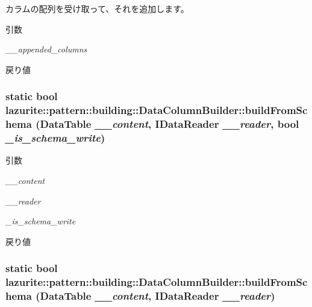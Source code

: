 カラムの配列を受け取って、それを追加します。 
\begin{DoxyParams}{引数}
\item[{\em \_\-\_\-appended\_\-columns}]\end{DoxyParams}
\begin{DoxyReturn}{戻り値}

\end{DoxyReturn}
\hypertarget{classlazurite_1_1pattern_1_1building_1_1_data_column_builder_a25241beb4bdca602a6401e0e326acf7b}{
\subsubsection[{buildFromSchema}]{\setlength{\rightskip}{0pt plus 5cm}static bool lazurite::pattern::building::DataColumnBuilder::buildFromSchema (DataTable {\em \_\-\_\-content}, \/  IDataReader {\em \_\-\_\-reader}, \/  bool {\em \_\-is\_\-schema\_\-write})}}
\label{classlazurite_1_1pattern_1_1building_1_1_data_column_builder_a25241beb4bdca602a6401e0e326acf7b}

\begin{DoxyParams}{引数}
\item[{\em \_\-\_\-content}]\item[{\em \_\-\_\-reader}]\item[{\em \_\-is\_\-schema\_\-write}]\end{DoxyParams}
\begin{DoxyReturn}{戻り値}

\end{DoxyReturn}
\hypertarget{classlazurite_1_1pattern_1_1building_1_1_data_column_builder_afe2795803790c7f24554b6809aee2c51}{
\subsubsection[{buildFromSchema}]{\setlength{\rightskip}{0pt plus 5cm}static bool lazurite::pattern::building::DataColumnBuilder::buildFromSchema (DataTable {\em \_\-\_\-content}, \/  IDataReader {\em \_\-\_\-reader})}}
\label{classlazurite_1_1pattern_1_1building_1_1_data_column_builder_afe2795803790c7f24554b6809aee2c51}


